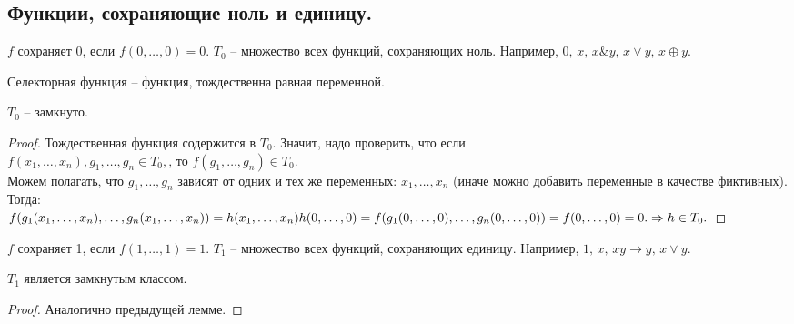 \subsection{Функции, сохраняющие ноль и единицу. \\}
\begin{definition}
	$f$ сохраняет 0, если $f(0,\ldots, 0)=0$.
	$T_0$ -- множество всех функций, сохраняющих ноль. Например, $0,\,x,\,x \& y,\, x \vee y,\, x \oplus y$.
\end{definition}
\begin{definition}
	Селекторная функция -- функция, тождественна равная переменной. \\
\end{definition}
\begin{lemma}
	$T_0 $ -- замкнуто. 
\end{lemma}
\begin{proof}
	Тождественная функция содержится в $T_0$. Значит, надо проверить, что если  \\
	 $f(x_1,\ldots, x_n),g_1, \ldots, g_n \in T_0, \text{, то~} f(g_1, \ldots, g_n) \in T_0.$ \\
	Можем полагать, что $g_1, \ldots, g_n$ зависят от одних и тех же переменных: $x_1, \ldots, x_n$ (иначе можно добавить переменные в качестве фиктивных). Тогда:\\
	$f(g_1(x_1, \ldots, x_n),\ldots, g_n(x_1, \ldots, x_n))=h(x_1, \ldots, x_n) \\
	h(0, \ldots, 0)=f(g_1(0,\ldots,0),\ldots,g_n(0, \ldots, 0))=f(0,\ldots,0)=0. \Rightarrow h \in T_0. 
$
\end{proof}
\begin{definition}
	$f$ сохраняет 1, если $f(1,\ldots, 1)=1$.
	$T_1$ -- множество всех функций, сохраняющих единицу. Например, $1,\,x,\,xy\rightarrow y, \,x \vee y$.
\end{definition}
\begin{lemma}
	$T_1 $ является замкнутым классом. 
\end{lemma}
\begin{proof}
	Аналогично предыдущей лемме. 
\end{proof}
